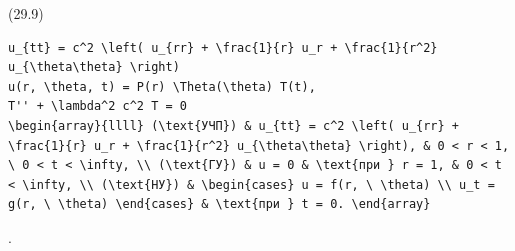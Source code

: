 \documentclass[
  ukrainian,
]{article}
\begin{document}
(29.9)

\begin{verbatim}
u_{tt} = c^2 \left( u_{rr} + \frac{1}{r} u_r + \frac{1}{r^2} u_{\theta\theta} \right)
u(r, \theta, t) = P(r) \Theta(\theta) T(t),
T'' + \lambda^2 c^2 T = 0
\begin{array}{llll} (\text{УЧП}) & u_{tt} = c^2 \left( u_{rr} + \frac{1}{r} u_r + \frac{1}{r^2} u_{\theta\theta} \right), & 0 < r < 1, \ 0 < t < \infty, \\ (\text{ГУ}) & u = 0 & \text{при } r = 1, & 0 < t < \infty, \\ (\text{НУ}) & \begin{cases} u = f(r, \ \theta) \\ u_t = g(r, \ \theta) \end{cases} & \text{при } t = 0. \end{array}
\end{verbatim}

.
\end{document}
